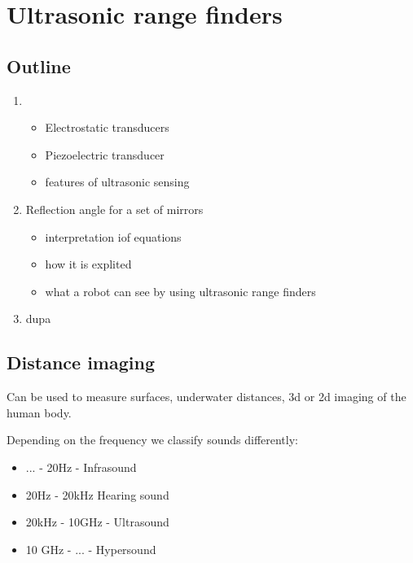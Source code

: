 \chapter{Ultrasonic range finders}

\section{Outline}
\begin{enumerate}
    \item 
        \begin{itemize}
                \item Electrostatic transducers
                \item Piezoelectric transducer
                \item features of ultrasonic sensing
                
        \end{itemize}
    \item Reflection angle for a set of mirrors
        \begin{itemize}
    \item interpretation iof equations
    \item how it is explited
    \item what a robot can see by using ultrasonic range finders
    \end{itemize}
\item dupa
\end{enumerate}


\section{Distance imaging}
Can be used to measure surfaces, underwater distances, 3d or 2d imaging of the human body.



{
    Depending on the frequency we classify sounds differently:

    \begin{itemize}
        \item ... - 20Hz - Infrasound
        \item 20Hz - 20kHz Hearing sound
        \item 20kHz - 10GHz - Ultrasound
        \item 10 GHz - ... - Hypersound 
    \end{itemize}
}





